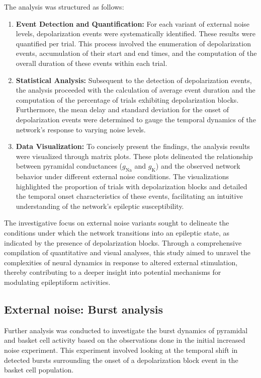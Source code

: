 \noindent The analysis was structured as follows:
\begin{enumerate}
    \item \textbf{Event Detection and Quantification:} For each variant of external noise levels, depolarization events were systematically identified. These results were quantified per trial. This process involved the enumeration of depolarization events, accumulation of their start and end times, and the computation of the overall duration of these events within each trial.

    \item \textbf{Statistical Analysis:} Subsequent to the detection of depolarization events, the analysis proceeded with the calculation of average event duration and the computation of the percentage of trials exhibiting depolarization blocks. Furthermore, the mean delay and standard deviation for the onset of depolarization events were determined to gauge the temporal dynamics of the network's response to varying noise levels.

    \item \textbf{Data Visualization:} To concisely present the findings, the analysis results were visualized through matrix plots. These plots delineated the relationship between pyramidal conductances (\(g_{\text{Na}}\) and \(g_{\text{K}}\)) and the observed network behavior under different external noise conditions. The visualizations highlighted the proportion of trials with depolarization blocks and detailed the temporal onset characteristics of these events, facilitating an intuitive understanding of the network's epileptic susceptibility.
\end{enumerate}

\noindent The investigative focus on external noise variants sought to delineate the conditions under which the network transitions into an epileptic state, as indicated by the presence of depolarization blocks. Through a comprehensive compilation of quantitative and visual analyses, this study aimed to unravel the complexities of neural dynamics in response to altered external stimulation, thereby contributing to a deeper insight into potential mechanisms for modulating epileptiform activities.
\pagebreak
\subsection{External noise: Burst analysis}
Further analysis was conducted to investigate the burst dynamics of pyramidal
and basket cell activity based on the observations done in the initial
increased noise experiment. This experiment involved looking at the temporal
shift in detected bursts surrounding the onset of a depolarization block event
in the basket cell population.

